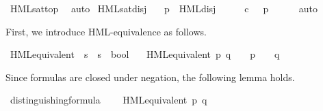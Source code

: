 \begin{isabellebody}
\isamarkupfalse%
\ HML{\isacharunderscore}{\kern0pt}sat{\isacharunderscore}{\kern0pt}top\ \isamarkupfalse%
\ auto%
\endisatagproof
{\isafoldproof}%
%
\isadelimproof
\isanewline
%
\endisadelimproof
{}\isamarkupfalse%
\ HML{\isacharunderscore}{\kern0pt}sat{\isacharunderscore}{\kern0pt}disj{\isacharcolon}{\kern0pt}\isanewline
\ \ \ {\isacartoucheopen}{\isacharparenleft}{\kern0pt}p\ {\isasymTurnstile}\ HML{\isacharunderscore}{\kern0pt}disj\ {\isasymPhi}{\isacharparenright}{\kern0pt}\ {\isacharequal}{\kern0pt}\ {\isacharparenleft}{\kern0pt}{\isasymexists}\ {\isasymphi}{\isachardot}{\kern0pt}\ {\isasymphi}\ {\isasymin}\isactrlsub c\ {\isasymPhi}\ {\isasymand}\ p\ {\isasymTurnstile}\ {\isasymphi}{\isacharparenright}{\kern0pt}{\isacartoucheclose}\isanewline
%
\isadelimproof
\ \ %
\endisadelimproof
%
\isatagproof
{}\isamarkupfalse%
\ auto%
\endisatagproof
{\isafoldproof}%
%
\isadelimproof
%
\endisadelimproof
%
\isadelimdocument
%
\endisadelimdocument
%
\isatagdocument
%
\isamarkuptrue%
%
\endisatagdocument
{\isafolddocument}%
%
\isadelimdocument
%
\endisadelimdocument
%
\begin{isamarkuptext}%
First, we introduce HML-equivalence as follows.%
\end{isamarkuptext}\isamarkuptrue%
\isamarkupfalse%
\ HML{\isacharunderscore}{\kern0pt}equivalent\ {\isacharcolon}{\kern0pt}{\isacharcolon}{\kern0pt}\ {\isacartoucheopen}{\isacharprime}{\kern0pt}s\ {\isasymRightarrow}\ {\isacharprime}{\kern0pt}s\ {\isasymRightarrow}\ bool{\isacartoucheclose}\isanewline
\ \ \ {\isacartoucheopen}HML{\isacharunderscore}{\kern0pt}equivalent\ p\ q\ {\isasymequiv}\ {\isacharparenleft}{\kern0pt}{\isasymforall}\ {\isasymphi}{\isachardot}{\kern0pt}\ {\isacharparenleft}{\kern0pt}p\ {\isasymTurnstile}\ {\isasymphi}{\isacharparenright}{\kern0pt}\ {\isasymlongleftrightarrow}\ {\isacharparenleft}{\kern0pt}q\ {\isasymTurnstile}\ {\isasymphi}{\isacharparenright}{\kern0pt}{\isacharparenright}{\kern0pt}{\isacartoucheclose}%
\begin{isamarkuptext}%
Since formulas are closed under negation, the following lemma holds.%
\end{isamarkuptext}\isamarkuptrue%
\isamarkupfalse%
\ distinguishing{\isacharunderscore}{\kern0pt}formula{\isacharcolon}{\kern0pt}\isanewline
\ \ \ {\isacartoucheopen}{\isasymnot}\ HML{\isacharunderscore}{\kern0pt}equivalent\ p\ q{\isacartoucheclose}\isanewline

\end{isabellebody}
